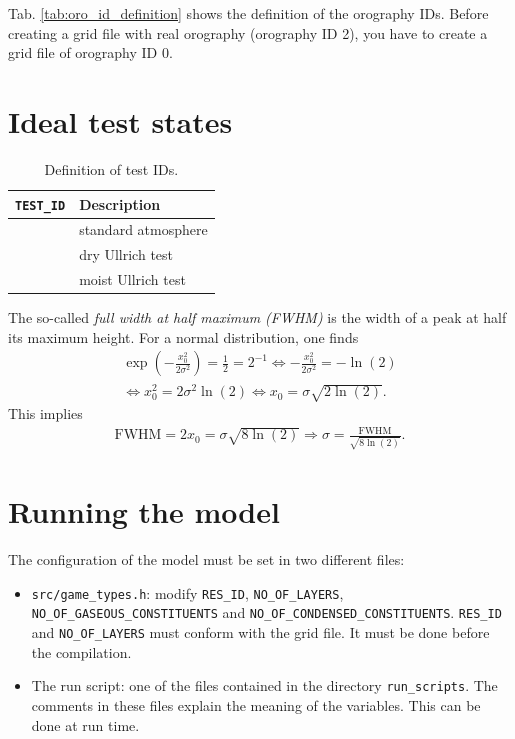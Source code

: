 \documentclass[10pt]{report}
\begin{document}
Tab. \ref{tab:oro_id_definition} shows the definition of the orography IDs. Before creating a grid file with real orography (orography ID 2), you have to create a grid file of orography ID 0.

\chapter{Ideal test states}
\label{chap:ideal_test_states}

\renewcommand{\arraystretch}{1.2}
\begin{table}
\centering
\begin{tabular}{|>{\centering}p{4.0 cm}|>{\centering}p{8 cm}|}
\hline \textbf{\texttt{TEST\_ID}} & \textbf{Description} \tabularnewline
\hline\hline 0 & standard atmosphere \tabularnewline
\hline 1 & dry Ullrich test \tabularnewline
\hline 2 & moist Ullrich test \tabularnewline
\hline
\end{tabular}
\caption{Definition of test IDs.}
\label{tab:test_id_definition}
\end{table}
\renewcommand{\arraystretch}{1}

The so-called \textit{full width at half maximum (FWHM)} is the width of a peak at half its maximum height. For a normal distribution, one finds
%
\begin{align}
\exp\left(-\frac{x_0^2}{2\sigma^2}\right) = \frac{1}{2} = 2^{-1}\Leftrightarrow -\frac{x_0^2}{2\sigma^2} = -\ln\left(2\right)\nonumber\\
\Leftrightarrow x_0^2 = 2\sigma^2\ln\left(2\right)\Leftrightarrow x_0 = \sigma\sqrt{2\ln\left(2\right)}.
\end{align}
%
This implies
%
\begin{align}
\text{FWHM} = 2x_0 = \sigma\sqrt{8\ln\left(2\right)} \Rightarrow \sigma = \frac{\text{FWHM}}{\sqrt{8\ln\left(2\right)}}.
\end{align}

\chapter{Running the model}
\label{chap:running_the_model}

The configuration of the model must be set in two different files:
%
\begin{itemize}
\item \texttt{src/game\_types.h}: modify \texttt{RES\_ID}, \texttt{NO\_OF\_LAYERS}, \texttt{NO\_OF\_GASEOUS\_CONSTITUENTS} and \texttt{NO\_OF\_CONDENSED\_CONSTITUENTS}. \texttt{RES\_ID} and \texttt{NO\_OF\_LAYERS} must conform with the grid file. It must be done before the compilation.
\item The run script: one of the files contained in the directory \texttt{run\_scripts}. The comments in these files explain the meaning of the variables. This can be done at run time.
\end{itemize}
\end{document}
